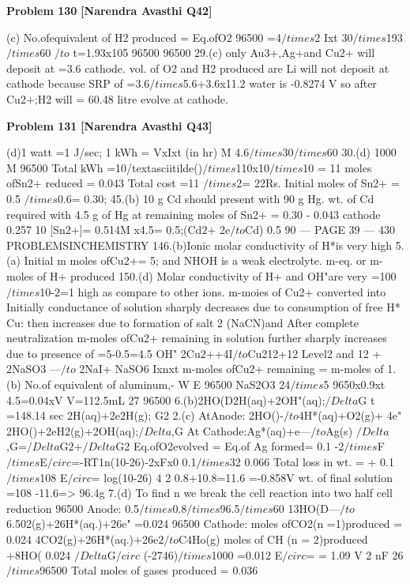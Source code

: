 \begin{problembox}
\textbf{Problem 130} \hfill \textbf{[Narendra Avasthi Q42]}
\label{q:ext-narendra_avasthi_all_questions-130}

(c) No.ofequivalent of H2 produced = Eq.ofO2
96500
=4$/times$2
Ixt
30$/times$193$/times$60
$/to$
t=1.93x105
96500
96500
29.(c) only Au3+,Ag+and Cu2+ will deposit at
=3.6
cathode.
vol. of O2 and H2 produced are
Li will not deposit at cathode because SRP of
=3.6$/times$5.6+3.6x11.2
water is -0.8274 V so after Cu2+;H2 will
= 60.48 litre
evolve at cathode.
\end{problembox}

\begin{problembox}
\textbf{Problem 131} \hfill \textbf{[Narendra Avasthi Q43]}
\label{q:ext-narendra_avasthi_all_questions-131}

(d)1 watt =1 J/sec; 1 kWh =
VxIxt
(in hr)
M
4.6$/times$30$/times$60
30.(d)
1000
M
96500
Total kWh =10/textasciitilde()$/times$110x10$/times$10 = 11
moles ofSn2+ reduced = 0.043
Total cost =11 $/times$2= 22Rs.
Initial moles of Sn2+ = 0.5 $/times$0.6= 0.30;
45.(b) 10 g Cd should present with 90 g Hg.
wt. of Cd required with 4.5 g of Hg at
remaining moles of Sn2+ = 0.30 - 0.043
cathode
0.257
10
[Sn$2$+]=
0.514M
x4.5= 0.5;(Cd$2$+ 2e$/to$Cd)
0.5
90
--- PAGE 39 ---
430
PROBLEMSINCHEMISTRY
146.(b)Ionic molar conductivity of H*is very high
5.(a) Initial m moles ofCu$2$+= 5;
and NHOH is a weak electrolyte.
m-eq. or m-moles of H+ produced
150.(d) Molar conductivity of H+ and OH"are very
=100$/times$10-$2$=1
high as compare to other ions.
m-moies of Cu2+ converted into
Initially conductance of solution sharply
decreases due to consumption of free H*
Cu: 
then increases due to formation of salt
2
(NaCN)and After complete neutralization
m-moles ofCu2+ remaining in solution
further sharply increases due to presence of
=5-0.5=4.5
OH"
2Cu$2$++4I$/to$Cu212+12
Level2
and 12 + 2NaSO3 ---$/to$ 2NaI+ NaSO6
\underline{\hspace{1cm}}Ixnxt
m-moles ofCu2+ remaining = m-moles of
1.(b) No.of equivalent of aluminum,-
W
E
96500
NaS2O3
24$/times$5
9650x0.9xt
4.5=0.04xV
V=112.5mL
27
96500
6.(b)2HO(D2H(aq)+2OH"(aq);$/Delta$G
t =148.14 sec
2H(aq)+2e$2$H(g);
G2
2.(c) AtAnode:
2HO()-$/to$4H*(aq)+O2(g)+ 4e"
2HO()+2eH2(g)+2OH(aq);$/Delta$,G
At Cathode:Ag*(aq)+e---$/to$Ag(s)
$/Delta$,G=$/Delta$G$2$+$/Delta$G2
Eq.ofO2evolved = Eq.of Ag formed= 0.1
-2$/times$F$/times$E$/circ$=-RT1n(10-26)-2xFx0
0.1$/times$32
0.066
Total loss in wt. =
+ 0.1$/times$108
E$/circ$=
log(10-26)
4
2
0.8+10.8=11.6
=-0.858V
wt. of final solution =108 -11.6=> 96.4g
7.(d) To find n we break the cell reaction into two
half cell reduction
96500
Anode:
0.5$/times$0.8$/times$96.5$/times$60
13HO(D---$/to$6.502(g)+26H*(aq.)+26e"
=0.024
96500
Cathode:
moles ofCO2(n =1)produced = 0.024
4CO2(g)+26H*(aq.)+26e$2$$/to$C4Ho(g)
moles of CH (n = 2)produced
+8HO(
0.024
$/Delta$G$/circ$
(-2746)$/times$1000
=0.012
E$/circ$=
= 1.09 V
2
nF
26$/times$96500
Total moles of gases produced = 0.036
\end{problembox}

